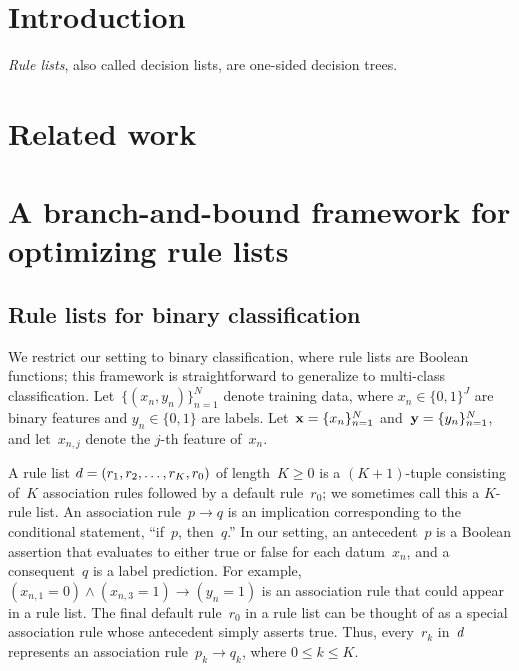 \section{Introduction}

\emph{Rule lists}, also called decision lists, are one-sided decision trees.

\section{Related work}

\citep{rivest:1987}

\citep{LethamRuMcMa15}

\citep{YangRuSe16}

\citep{garofalakis:2000-kdd,garofalakis:2000-sigkdd,garofalakis:2003}

\section{A branch-and-bound framework for optimizing rule lists}

\subsection{Rule lists for binary classification}
\label{sec:setup}

We restrict our setting to binary classification,
where rule lists are Boolean functions;
this framework is straightforward to generalize to multi-class classification.
%
Let~${\{(x_n, y_n)\}_{n=1}^N}$ denote training data,
where ${x_n \in \{0, 1\}^J}$ are binary features and ${y_n \in \{0, 1\}}$ are labels.
%
Let~${\mathbf{x} = \{x_n\}_{n=1}^N}$ and~${\mathbf{y} = \{y_n\}_{n=1}^N}$,
and let~${x_{n,j}}$ denote the $j$-th feature of~$x_n$.

A rule list ${{d} = (r_1, r_2, \dots, r_K, r_0)}$ of length~${K \ge 0}$ is a
${(K+1)}$-tuple consisting of~$K$ association rules followed by a default rule~$r_0$;
we sometimes call this a $K$-rule list.
%
An association rule~${p \rightarrow q}$ is an implication corresponding to the
conditional statement, ``if~$p$, then~$q$.''
%
In our setting, an antecedent~$p$ is a Boolean assertion that evaluates to either
true or false for each datum~$x_n$, and a consequent~$q$ is a label prediction.
%
For example,~${(x_{n, 1} = 0) \wedge (x_{n, 3} = 1) \rightarrow (y_n = 1)}$
is an association rule that could appear in a rule list.
%
%
The final default rule~$r_0$ in a rule list can be thought of as a special
association rule whose antecedent simply asserts true.
%
Thus, every~$r_k$ in~${d}$ represents an association rule~${p_k \rightarrow q_k}$,
where ${0 \le k\le K}$.

